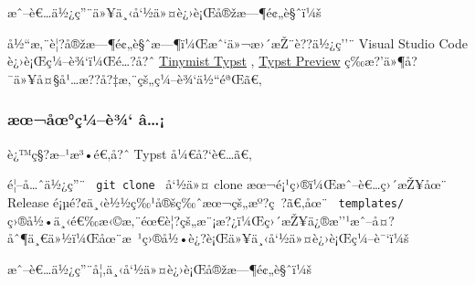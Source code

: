 æˆ--è€\ldots ä½¿ç''¨ä»¥ä¸‹å`½ä»¤è¿›è¡Œå®žæ---¶é¢„è§ˆï¼š

\begin{Shaded}
\begin{Highlighting}[]
\end{Highlighting}
\end{Shaded}

å½``æ‚¨è¦?å®žæ---¶é¢„è§ˆæ---¶ï¼Œæˆ`ä»¬æ›´æŽ¨è??ä½¿ç''¨ Visual Studio
Code è¿›è¡Œç¼--è¾`ï¼Œé\ldots?å?ˆ
\href{https://marketplace.visualstudio.com/items?itemName=nvarner.typst-lsp}{Tinymist
Typst} ,
\href{https://marketplace.visualstudio.com/items?itemName=mgt19937.typst-preview}{Typst
Preview} ç­‰æ?'ä»¶å?¯ä»¥å¤§å¹\ldots æ??å?‡æ‚¨çš„ç¼--è¾`ä½``éªŒã€‚

\subsubsection{æœ¬åœ°ç¼--è¾`
â\ldots¡}\label{uxe6ux153uxe5ux153uxe7uxbcuxe8uxbe-uxe2}

è¿™ç§?æ--¹æ³•é€‚å?ˆ Typst å¼€å?{}`è€\ldots ã€‚

é¦--å\ldots ˆä½¿ç''¨ \texttt{\ git\ clone\ } å`½ä»¤ clone
æœ¬é¡¹ç›®ï¼Œæˆ--è€\ldots ç›´æŽ¥åœ¨ Release
é¡µé?¢ä¸‹è½½ç‰¹å®šç‰ˆæœ¬çš„æº?ç~?ã€‚åœ¨ \texttt{\ templates/\ }
ç›®å½•ä¸‹é€‰æ‹©æ‚¨éœ€è¦?çš„æ¨¡æ?¿ï¼Œç›´æŽ¥ä¿®æ''¹æˆ--å¤?åˆ¶ä¸€ä»½ï¼Œåœ¨æ~¹ç›®å½•è¿?è¡Œä»¥ä¸‹å`½ä»¤è¿›è¡Œç¼--è¯`ï¼š

\begin{Shaded}
\begin{Highlighting}[]
\end{Highlighting}
\end{Shaded}

æˆ--è€\ldots ä½¿ç''¨å¦‚ä¸‹å`½ä»¤è¿›è¡Œå®žæ---¶é¢„è§ˆï¼š

\begin{Shaded}
\begin{Highlighting}[]
\end{Highlighting}
\end{Shaded}

